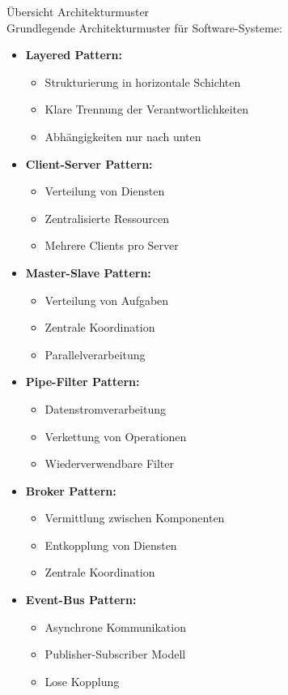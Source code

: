 \begin{concept}{Übersicht Architekturmuster}\\
Grundlegende Architekturmuster für Software-Systeme:

\begin{itemize}
    \item \textbf{Layered Pattern:} 
    \begin{itemize}
        \item Strukturierung in horizontale Schichten
        \item Klare Trennung der Verantwortlichkeiten
        \item Abhängigkeiten nur nach unten
    \end{itemize}
    
    \item \textbf{Client-Server Pattern:}
    \begin{itemize}
        \item Verteilung von Diensten
        \item Zentralisierte Ressourcen
        \item Mehrere Clients pro Server
    \end{itemize}
    
    \item \textbf{Master-Slave Pattern:}
    \begin{itemize}
        \item Verteilung von Aufgaben
        \item Zentrale Koordination
        \item Parallelverarbeitung
    \end{itemize}
    
    \item \textbf{Pipe-Filter Pattern:}
    \begin{itemize}
        \item Datenstromverarbeitung
        \item Verkettung von Operationen
        \item Wiederverwendbare Filter
    \end{itemize}
    
    \item \textbf{Broker Pattern:}
    \begin{itemize}
        \item Vermittlung zwischen Komponenten
        \item Entkopplung von Diensten
        \item Zentrale Koordination
    \end{itemize}
    
    \item \textbf{Event-Bus Pattern:}
    \begin{itemize}
        \item Asynchrone Kommunikation
        \item Publisher-Subscriber Modell
        \item Lose Kopplung
    \end{itemize}
\end{itemize}
\end{concept}

